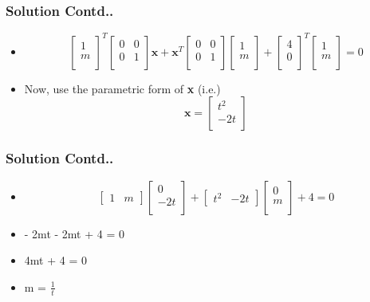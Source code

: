 \documentclass[12pt]{beamer}
\begin{document}
\begin{frame}
\frametitle{Solution Contd..}
\begin{itemize}
\item<1-2>
\[
\begin{bmatrix}
    1\\
    m\\  
\end{bmatrix}^T
\begin{bmatrix}
    0 & 0\\
    0 & 1\\  
\end{bmatrix}
\textbf{x} + 
\textbf{x}^T
\begin{bmatrix}
    0 & 0\\
    0 & 1\\  
\end{bmatrix}
\begin{bmatrix}
    1\\
    m\\  
\end{bmatrix} + 
\begin{bmatrix}
    4\\
    0\\  
\end{bmatrix}^T
\begin{bmatrix}
    1\\
    m\\  
\end{bmatrix} = 0
\]
\item<2> Now, use the parametric form of \textbf{x} (i.e.)
\[
\textbf{x} = 
\begin{bmatrix}
    t^2\\
    -2t\\  
\end{bmatrix}
\]
\end{itemize}
\end{frame}



\begin{frame}
\frametitle{Solution Contd..}
\begin{itemize}
\item<1-4>
\[
\begin{bmatrix}
    1 & m  
\end{bmatrix}
\begin{bmatrix}
    0\\
    -2t\\  
\end{bmatrix} + 
\begin{bmatrix}
    t^2 & -2t  
\end{bmatrix}
\begin{bmatrix}
    0\\
    m\\  
\end{bmatrix} + 4 = 0
\]
\item<2-4> - 2mt - 2mt + 4 = 0
\item<3-4> 4mt + 4 = 0
\item<4> m = $\frac{1}{t}$
\end{itemize}
\end{frame}
\end{document}
